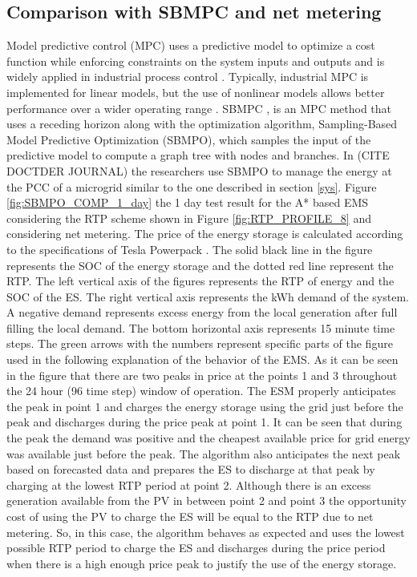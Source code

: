 \subsection{Comparison with SBMPC and net metering}
Model predictive control (MPC) uses a predictive model to optimize a cost function while enforcing constraints on the system inputs and outputs and is widely applied in industrial process control \cite{qin1997overview}. Typically, industrial MPC is implemented for linear models, but the use of nonlinear models allows better performance over a wider operating range \cite{berber2012nonlinear}. SBMPC \cite{dunlap2011book}, \cite{reese2016graph} is an MPC method that uses a receding horizon along with the optimization algorithm, Sampling-Based Model Predictive Optimization (SBMPO), which samples the input of the predictive model to compute a  graph tree with nodes and branches. In \colorbox{BurntOrange}{(CITE DOCTDER JOURNAL)} the researchers use SBMPO to manage the energy at the PCC of a microgrid similar to the one described in section \ref{sys}. Figure \ref{fig:SBMPO_COMP_1_day} the 1 day test result for the A* based EMS considering the RTP scheme shown in Figure \ref{fig:RTP_PROFILE_8} and considering net metering. The price of the energy storage is calculated according to the specifications of Tesla Powerpack \cite{tesla_powerpack_2018}. The solid black line in the figure represents the SOC of the energy storage and the dotted red line represent the RTP. The left vertical axis of the figures represents the RTP of energy and the SOC of the ES. The right vertical axis represents the kWh demand of the system. A negative demand represents excess energy from the local generation after full filling the local demand. The bottom horizontal axis represents 15 minute time steps. The green arrows with the numbers represent specific parts of the figure used in the following explanation of the behavior of the EMS. As it can be seen in the figure that there are two peaks in price at the points 1 and 3 throughout the 24 hour (96 time step) window of operation.  The ESM properly anticipates the peak in point 1 and charges the energy storage using the grid just before the peak and discharges during the price peak at point 1. It can be seen that during the peak the demand was positive and the cheapest available price for grid energy was available just before the peak. The algorithm also anticipates the next peak based on forecasted data and prepares the ES to discharge at that peak by charging at the lowest RTP period at point 2. Although there is an excess generation available from the PV in between point 2 and point 3 the opportunity cost of using the PV to charge the ES will be equal to the RTP due to net metering. So, in this case, the algorithm behaves as expected and uses the lowest possible RTP period to charge the ES and discharges during the price period when there is a high enough price peak to justify the use of the energy storage.
 
